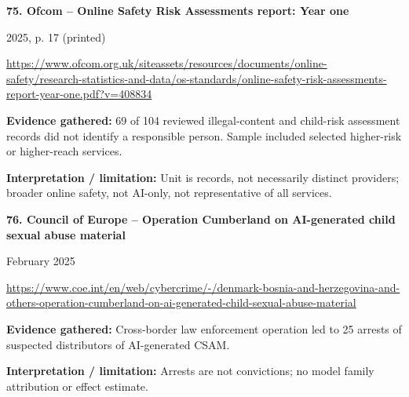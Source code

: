 \documentclass[11pt,a4paper]{article}
\begin{document}
\noindent\begin{minipage}{\linewidth}\textbf{75. Ofcom -- Online Safety Risk Assessments report: Year one}\par{\small 2025, p. 17 (printed)\par\url{https://www.ofcom.org.uk/siteassets/resources/documents/online-safety/research-statistics-and-data/os-standards/online-safety-risk-assessments-report-year-one.pdf?v=408834}}\par
\textbf{Evidence gathered:} 69 of 104 reviewed illegal-content and child-risk assessment records did not identify a responsible person. Sample included selected higher-risk or higher-reach services.\par\textbf{Interpretation / limitation:} Unit is records, not necessarily distinct providers; broader online safety, not AI-only, not representative of all services.\par\end{minipage}\par\vspace{2mm}
\noindent\begin{minipage}{\linewidth}\textbf{76. Council of Europe -- Operation Cumberland on AI-generated child sexual abuse material}\par{\small February 2025\par\url{https://www.coe.int/en/web/cybercrime/-/denmark-bosnia-and-herzegovina-and-others-operation-cumberland-on-ai-generated-child-sexual-abuse-material}}\par
\textbf{Evidence gathered:} Cross-border law enforcement operation led to 25 arrests of suspected distributors of AI-generated CSAM.\par\textbf{Interpretation / limitation:} Arrests are not convictions; no model family attribution or effect estimate.\par\end{minipage}\par\vspace{2mm}
\end{document}
